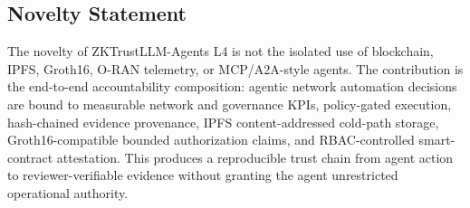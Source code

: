 \subsection{Novelty Statement}

The novelty of ZKTrustLLM-Agents L4 is not the isolated use of blockchain, IPFS, Groth16, O-RAN telemetry, or MCP/A2A-style agents. The contribution is the end-to-end accountability composition: agentic network automation decisions are bound to measurable network and governance KPIs, policy-gated execution, hash-chained evidence provenance, IPFS content-addressed cold-path storage, Groth16-compatible bounded authorization claims, and RBAC-controlled smart-contract attestation. This produces a reproducible trust chain from agent action to reviewer-verifiable evidence without granting the agent unrestricted operational authority.
